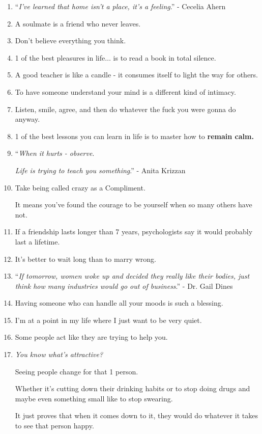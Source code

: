 \documentclass{article}
\numberwithin{equation}{section}
\begin{document}
\begin{enumerate}
    But can you please be easy on me sometimes?
    \item ``\textit{I've learned that home isn't a place, it's a feeling}.'' - Cecelia Ahern
    \item A soulmate is a friend who never leaves.
    \item Don't believe everything you think.
    \item 1 of the best pleasures in life$\ldots$ is to read a book in total silence.
    \item A good teacher is like a candle - it consumes itself to light the way for others.
    \item To have someone understand your mind is a different kind of intimacy.
    \item Listen, smile, agree, and then do whatever the fuck you were gonna do anyway.
    \item 1 of the best lessons you can learn in life is to master how to \textbf{remain calm.}
    \item ``\textit{When it hurts - observe}.
    
    \textit{Life is trying to teach you something}.'' - Anita Krizzan
    \item Take being called crazy as a Compliment.
    
    It means you've found the courage to be yourself when so many others have not.
    \item If a friendship lasts longer than 7 years, psychologists say it would probably last a lifetime.
    \item It's better to wait long than to marry wrong.
    \item ``\textit{If tomorrow, women woke up and decided they really like their bodies, just think how many industries would go out of business}.'' - Dr. Gail Dines
    \item Having someone who can handle all your moods is such a blessing.
    \item I'm at a point in my life where I just want to be very quiet.
    \item Some people act like they are trying to help you.
    \item \textit{You know what's attractive?}
    
    Seeing people change for that 1 person.
    
    Whether it's cutting down their drinking habits or to stop doing drugs and maybe even something small like to stop swearing.
    
    It just proves that when it comes down to it, they would do whatever it takes to see that person happy.
    

\end{enumerate}
\end{document}
